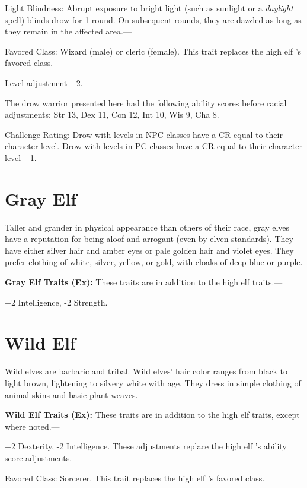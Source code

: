 \documentclass{article}
\begin{document}
Light Blindness: Abrupt exposure to bright light (such as sunlight or a \textit{daylight 
}spell) blinds drow for 1 round. On subsequent rounds, they are dazzled as long 
as they remain in the affected area.---

Favored Class: Wizard (male) or cleric (female). This trait replaces the high elf 
's favored class.---

Level adjustment +2.

The drow warrior presented here had the following ability scores before racial 
adjustments: Str 13, Dex 11, Con 12, Int 10, Wis 9, Cha 8.

Challenge Rating: Drow with levels in NPC classes have a CR equal to their character 
level. Drow with levels in PC classes have a CR equal to their character level 
+1.

\vspace{12pt}
\section*{\textbf{Gray Elf}}

Taller and grander in physical appearance than others of their race, gray elves 
have a reputation for being aloof and arrogant (even by elven standards). They 
have either silver hair and amber eyes or pale golden hair and violet eyes. They 
prefer clothing of white, silver, yellow, or gold, with cloaks of deep blue or 
purple.

\textbf{Gray Elf Traits (Ex):} These traits are in addition to the high elf traits.--- 

\parindent=3pt
+2 Intelligence, -2 Strength.

\vspace{12pt}
\section*{\textbf{Wild Elf}}

\parindent=0pt
Wild elves are barbaric and tribal. Wild elves' hair color ranges from black to 
light brown, lightening to silvery white with age. They dress in simple clothing 
of animal skins and basic plant weaves.

\textbf{Wild Elf Traits (Ex): }These traits are in addition to the high elf traits, 
except where noted.--- 

\parindent=3pt
+2 Dexterity, -2 Intelligence. These adjustments replace the high elf 's ability 
score adjustments.---

\parindent=0pt
Favored Class: Sorcerer. This trait replaces the high elf 's favored class.
\end{document}
